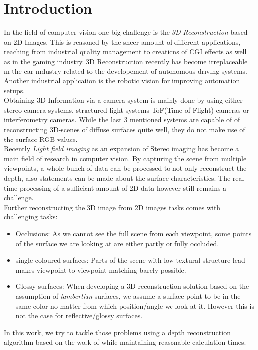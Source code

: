 \documentclass  [
  paper    = a4,
  BCOR     = 10mm,
  twoside,
  fontsize = 12pt,
  fleqn,
  toc      = bibnumbered,
  toc      = listofnumbered,
  numbers  = noendperiod,
  headings = normal,
  listof   = leveldown,
  version  = 3.03
]                                       {scrreprt}
\begin{document}
  

  \tableofcontents


\chapter{Introduction}
In the field of computer vision one big challenge is the \textit{3D Reconstruction} based on 2D Images. This is reasoned by the sheer amount of different applications, reaching from industrial quality management to creations of CGI effects as well as in the gaming industry. 3D Reconstruction recently has become irreplaceable in the car industry related to the developement of autonomous driving systems. Another industrial application is the robotic vision for improving automation setups.\\

Obtaining 3D Information via a camera system is mainly done by using either stereo camera systems, structured light systems ToF(Time-of-Flight)-cameras or 
interferometry cameras. While the last 3 mentioned systems are capable of of reconstructing 3D-scenes of diffuse surfaces quite well, they do not make use of the surface RGB values.\\
Recently \textit{Light field imaging} as an expansion of Stereo imaging has become a main field of research in computer vision. By capturing the scene from multiple viewpoints, a whole bunch of data can be processed to not only reconstruct the depth, also statements can be made about the surface characteristics. The real time processing of a sufficient amount of 2D data however still remains a challenge. \\
Further reconstructing the 3D image from 2D images tasks comes with challenging tasks:
\begin{itemize}
	\item Occlusions: As we cannot see the full scene from each viewpoint, some points of the surface we are looking at are either partly or fully occluded.
	\item single-coloured surfaces: Parts of the scene with low textural structure lead makes viewpoint-to-viewpoint-matching barely possible.
	\item Glossy surfaces: When developing a 3D reconstruction solution based on the assumption of \textit{lambertian} surfaces, we assume a surface point to be in the same color no matter from which position/angle we look at it. However this is not the case for reflective/glossy surfaces.
\end{itemize}
In this work, we try to tackle those problems using a depth reconstruction algorithm based on the work of \cite{wanner2014orientation} while maintaining reasonable calculation times.
\end{document}
